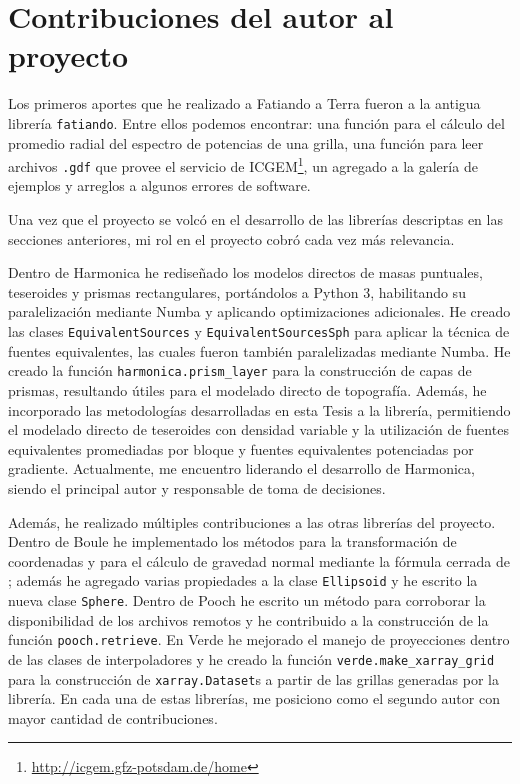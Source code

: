 \section{Contribuciones del autor al proyecto}

Los primeros aportes que he realizado a Fatiando a Terra fueron a la antigua
librería \texttt{fatiando}. Entre ellos podemos encontrar: una función para el
cálculo del promedio radial del espectro de potencias de una grilla, una
función para leer archivos \texttt{.gdf} que provee el servicio de
ICGEM\footnote{\url{http://icgem.gfz-potsdam.de/home}}, un agregado a la
galería de ejemplos y arreglos a algunos errores de software.

Una vez que el proyecto se volcó en el desarrollo de las librerías descriptas
en las secciones anteriores, mi rol en el proyecto cobró cada vez más
relevancia.

Dentro de Harmonica he rediseñado los modelos directos de masas
puntuales, teseroides y prismas rectangulares, portándolos a Python
3, habilitando su paralelización mediante Numba y aplicando optimizaciones
adicionales.
He creado las clases \texttt{EquivalentSources} y \texttt{EquivalentSourcesSph}
para aplicar la técnica de fuentes equivalentes, las cuales fueron también
paralelizadas mediante Numba.
He creado la función \texttt{harmonica.prism\_layer} para la construcción de
capas de prismas, resultando útiles para el modelado directo de topografía.
Además, he incorporado las metodologías desarrolladas en esta Tesis a la
librería, permitiendo el modelado directo de teseroides con densidad variable
y la utilización de fuentes equivalentes promediadas por bloque y fuentes
equivalentes potenciadas por gradiente.
Actualmente, me encuentro liderando el desarrollo de Harmonica, siendo el
principal autor y responsable de toma de decisiones.

Además, he realizado múltiples contribuciones a las otras librerías del
proyecto. Dentro de Boule he implementado los métodos para la transformación de
coordenadas y para el cálculo de gravedad normal mediante la fórmula cerrada de
\citet{ligotze2001}; además he agregado varias propiedades a la clase
\texttt{Ellipsoid} y he escrito la nueva clase \texttt{Sphere}.
Dentro de Pooch he escrito un método para corroborar la disponibilidad de los
archivos remotos y he contribuido a la construcción de la función
\texttt{pooch.retrieve}.
En Verde he mejorado el manejo de proyecciones dentro de las clases de
interpoladores y he creado la función \texttt{verde.make\_xarray\_grid} para la
construcción de \texttt{xarray.Dataset}s a partir de las grillas generadas por
la librería.
En cada una de estas librerías, me posiciono como el segundo autor con mayor
cantidad de contribuciones.


